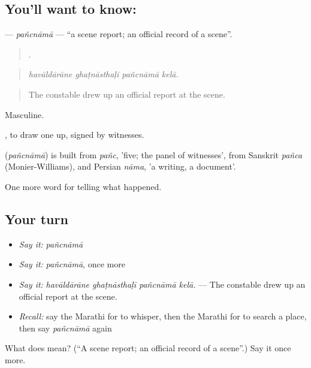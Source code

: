 \subsection*{You'll want to know: }
\textbf{} — \emph{pañcnāmā} — \textquotedblleft{}a scene report; an official record of a scene\textquotedblright{}.

\begin{quote}
   .
\end{quote}

\begin{quote}
\emph{havāldārāne ghaṭnāsthaḷī pañcnāmā kelā.}
\end{quote}

\begin{quote}
The constable drew up an official report at the scene.
\end{quote}

Masculine.

 , to draw one up, signed by witnesses.

\begin{cousinweb}
\textbf{} (\emph{pañcnāmā}) is built from \emph{pañc}, 'five; the panel of witnesses', from Sanskrit \emph{pañca} (Monier-Williams), and Persian \emph{nāma}, 'a writing, a document'.
\end{cousinweb}

\begin{grammarlens}[title={What you've built}]
One more word for telling what happened.
\end{grammarlens}

\subsection*{Your turn}
\begin{itemize}
\raggedright
  \item \emph{Say it:} \emph{pañcnāmā}
  \item \emph{Say it:} \emph{pañcnāmā}, once more
  \item \emph{Say it:} \emph{havāldārāne ghaṭnāsthaḷī pañcnāmā kelā.} — The constable drew up an official report at the scene.
  \item \emph{Recall:} say the Marathi for to whisper, then the Marathi for to search a place, then say \emph{pañcnāmā} again
\end{itemize}

\begin{tcolorbox}[breakable,colback=teal!4,colframe=teal!35!black,title={Before you move on}]
What does  mean? (\textquotedblleft{}A scene report; an official record of a scene\textquotedblright{}.) Say it once more.
\end{tcolorbox}
